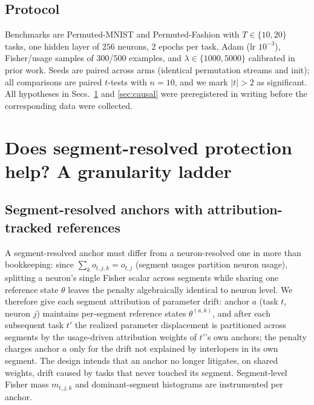 \documentclass[10pt]{article}
\begin{document}
\subsection{Protocol}
\label{sec:protocol}

\label{sec:protocol}

Benchmarks are Permuted-MNIST and Permuted-Fashion \citep{parisi2019,xiao2017} with
$T\in\{10,20\}$ tasks, one hidden layer of $256$ neurons, $2$ epochs per
task, Adam (lr $10^{-3}$), Fisher/usage samples of $300$/$500$ examples, and
$\lambda \in \{1000, 5000\}$ calibrated in prior work. Seeds are paired
across arms (identical permutation streams and init); all comparisons are
paired $t$-tests with $n{=}10$, and we mark $|t|>2$ as significant. All
hypotheses in Secs.~\ref{sec:granularity} and \ref{sec:causal} were
preregistered in writing before the corresponding data were collected.






\section{Does segment-resolved protection help? A granularity ladder}
\label{sec:granularity}

\subsection{Segment-resolved anchors with attribution-tracked references}
\label{sec:branchdesign}

A segment-resolved anchor must differ from a neuron-resolved one in more
than bookkeeping: since $\sum_k o_{t,j,k} = o_{t,j}$ (segment usages
partition neuron usage), splitting a neuron's single Fisher scalar across
segments while sharing one reference state $\theta$ leaves the penalty
algebraically identical to neuron level. We therefore give each segment
attribution of parameter drift: anchor $a$ (task $t$, neuron $j$) maintains
per-segment reference states $\theta^{(a,k)}$, and after each subsequent
task $t'$ the realized parameter displacement is partitioned across segments
by the usage-driven attribution weights of $t'$'s own anchors; the penalty
charges anchor $a$ only for the drift not explained by interlopers in its
own segment. The design intends that an anchor no longer litigates, on
shared weights, drift caused by tasks that never touched its segment.
Segment-level Fisher mass $m_{t,j,k}$ and dominant-segment histograms are
instrumented per anchor.
\end{document}
